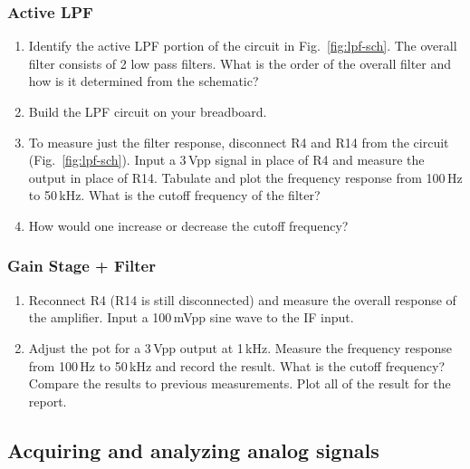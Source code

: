 \documentclass[letterpaper, 11pt]{article}
\begin{document}
\subsubsection{Active LPF}
\begin{enumerate}
	\item Identify the active LPF portion of the circuit in Fig.~\ref{fig:lpf-sch}. The overall filter consists of 2 low pass filters. What is the order of the overall filter and how is it determined from the schematic?
	
	\item Build the LPF circuit on your breadboard. 
	
	\item To measure just the filter response, disconnect R4 and R14 from the circuit (Fig.~\ref{fig:lpf-sch}). Input a 3\,Vpp signal in place of R4 and measure the output in place of R14. Tabulate and plot the frequency response from 100\,Hz to 50\,kHz. What is the cutoff frequency of the filter?
	
	\item How would one increase or decrease the cutoff frequency?
	
\end{enumerate}



\subsubsection{Gain Stage + Filter}
\begin{enumerate}
	\item Reconnect R4 (R14 is still disconnected) and measure the overall response of the amplifier. Input a 100\,mVpp sine wave to the IF input. 
	
	\item Adjust the pot for a 3\,Vpp output at 1\,kHz. Measure the frequency response from 100\,Hz to 50\,kHz and record the result. What is the cutoff frequency? Compare the results to previous measurements. Plot all of the result for the report.

\end{enumerate}


\subsection{Acquiring and analyzing analog signals}
\label{sec:adc}
\end{document}
